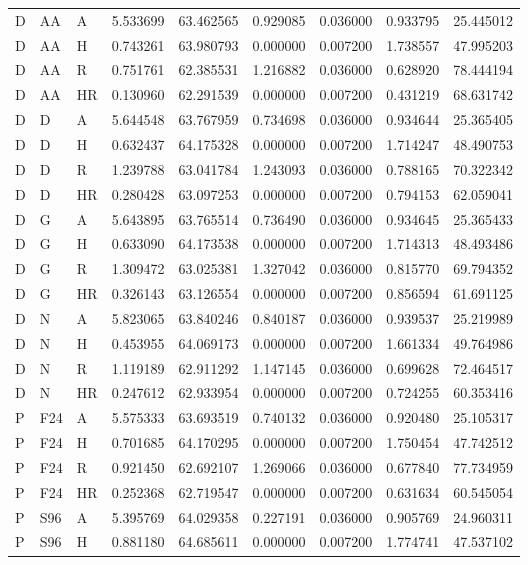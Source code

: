 \begin{longtable}{lllllllll}
D & AA & A & 5.533699 & 63.462565 & 0.929085 & 0.036000 & 0.933795 & 25.445012\\
D & AA & H & 0.743261 & 63.980793 & 0.000000 & 0.007200 & 1.738557 & 47.995203\\
D & AA & R & 0.751761 & 62.385531 & 1.216882 & 0.036000 & 0.628920 & 78.444194\\
D & AA & HR & 0.130960 & 62.291539 & 0.000000 & 0.007200 & 0.431219 & 68.631742\\
D & D & A & 5.644548 & 63.767959 & 0.734698 & 0.036000 & 0.934644 & 25.365405\\
D & D & H & 0.632437 & 64.175328 & 0.000000 & 0.007200 & 1.714247 & 48.490753\\
D & D & R & 1.239788 & 63.041784 & 1.243093 & 0.036000 & 0.788165 & 70.322342\\
D & D & HR & 0.280428 & 63.097253 & 0.000000 & 0.007200 & 0.794153 & 62.059041\\
D & G & A & 5.643895 & 63.765514 & 0.736490 & 0.036000 & 0.934645 & 25.365433\\
D & G & H & 0.633090 & 64.173538 & 0.000000 & 0.007200 & 1.714313 & 48.493486\\
D & G & R & 1.309472 & 63.025381 & 1.327042 & 0.036000 & 0.815770 & 69.794352\\
D & G & HR & 0.326143 & 63.126554 & 0.000000 & 0.007200 & 0.856594 & 61.691125\\
D & N & A & 5.823065 & 63.840246 & 0.840187 & 0.036000 & 0.939537 & 25.219989\\
D & N & H & 0.453955 & 64.069173 & 0.000000 & 0.007200 & 1.661334 & 49.764986\\
D & N & R & 1.119189 & 62.911292 & 1.147145 & 0.036000 & 0.699628 & 72.464517\\
D & N & HR & 0.247612 & 62.933954 & 0.000000 & 0.007200 & 0.724255 & 60.353416\\
P & F24 & A & 5.575333 & 63.693519 & 0.740132 & 0.036000 & 0.920480 & 25.105317\\
P & F24 & H & 0.701685 & 64.170295 & 0.000000 & 0.007200 & 1.750454 & 47.742512\\
P & F24 & R & 0.921450 & 62.692107 & 1.269066 & 0.036000 & 0.677840 & 77.734959\\
P & F24 & HR & 0.252368 & 62.719547 & 0.000000 & 0.007200 & 0.631634 & 60.545054\\
P & S96 & A & 5.395769 & 64.029358 & 0.227191 & 0.036000 & 0.905769 & 24.960311\\
P & S96 & H & 0.881180 & 64.685611 & 0.000000 & 0.007200 & 1.774741 & 47.537102\\

\end{longtable}
